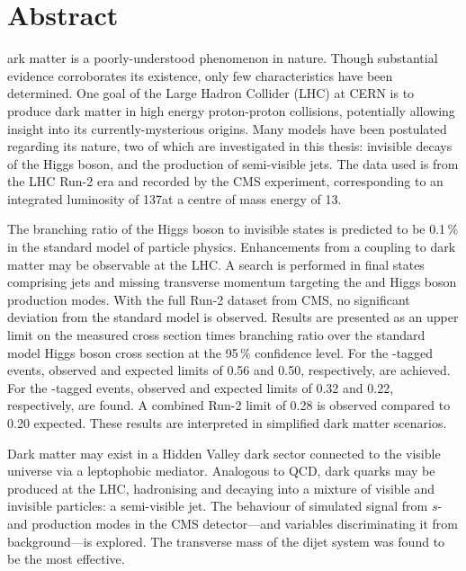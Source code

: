%
%
%

\chapter*{Abstract}
\begin{SingleSpace}
ark matter is a poorly-understood phenomenon in nature. Though substantial evidence corroborates its existence, only few characteristics have been determined. One goal of the Large Hadron Collider (LHC) at CERN is to produce dark matter in high energy proton-proton collisions, potentially allowing insight into its currently-mysterious origins. Many models have been postulated regarding its nature, two of which are investigated in this thesis: invisible decays of the Higgs boson, and the production of semi-visible jets. The data used is from the LHC Run-2 era and recorded by the CMS experiment, corresponding to an integrated luminosity of 137\fbinv at a centre of mass energy of 13\TeV.

The branching ratio of the Higgs boson to invisible states is predicted to be 0.1\,\% in the standard model of particle physics. Enhancements from a coupling to dark matter may be observable at the LHC. A search is performed in final states comprising jets and missing transverse momentum targeting the \ttH and \VH Higgs boson production modes. With the full Run-2 dataset from CMS, no significant deviation from the standard model is observed. Results are presented as an upper limit on the measured cross section times branching ratio over the standard model Higgs boson cross section at the 95\,\% confidence level. For the \ttH-tagged events, observed and expected limits of 0.56 and 0.50, respectively, are achieved. For the \VH-tagged events, observed and expected limits of 0.32 and 0.22, respectively, are found. A combined Run-2 limit of 0.28 is observed compared to 0.20 expected. These results are interpreted in simplified dark matter scenarios.

Dark matter may exist in a Hidden Valley dark sector connected to the visible universe via a leptophobic mediator. Analogous to QCD, dark quarks may be produced at the LHC, hadronising and decaying into a mixture of visible and invisible particles: a semi-visible jet. The behaviour of simulated signal from $s$- and \tchannel production modes in the CMS detector---and variables discriminating it from background---is explored. The transverse mass of the dijet system was found to be the most effective.
\end{SingleSpace}
\clearpage
